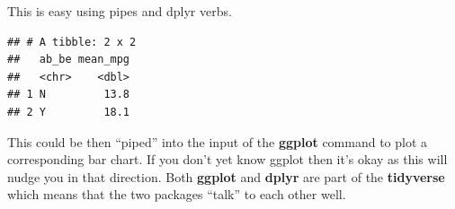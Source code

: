 \documentclass[]{book}
\newenvironment{Shaded}{\begin{snugshade}}{\end{snugshade}}
\newcommand{\DataTypeTok}[1]{\textcolor[rgb]{0.13,0.29,0.53}{#1}}
\newcommand{\FloatTok}[1]{\textcolor[rgb]{0.00,0.00,0.81}{#1}}
\newcommand{\KeywordTok}[1]{\textcolor[rgb]{0.13,0.29,0.53}{\textbf{#1}}}
\newcommand{\NormalTok}[1]{#1}
\newcommand{\OperatorTok}[1]{\textcolor[rgb]{0.81,0.36,0.00}{\textbf{#1}}}
\newcommand{\StringTok}[1]{\textcolor[rgb]{0.31,0.60,0.02}{#1}}
\begin{document}
This is easy using pipes and dplyr verbs.

\begin{Shaded}
\end{Shaded}

\begin{verbatim}
## # A tibble: 2 x 2
##   ab_be mean_mpg
##   <chr>    <dbl>
## 1 N         13.8
## 2 Y         18.1
\end{verbatim}

This could be then ``piped'' into the input of the \textbf{ggplot} command to plot a corresponding bar chart. If you don't yet know ggplot then it's okay as this will nudge you in that direction. Both \textbf{ggplot} and \textbf{dplyr} are part of the \textbf{tidyverse} which means that the two packages ``talk'' to each other well.

\begin{Shaded}
\end{Shaded}
\end{document}
